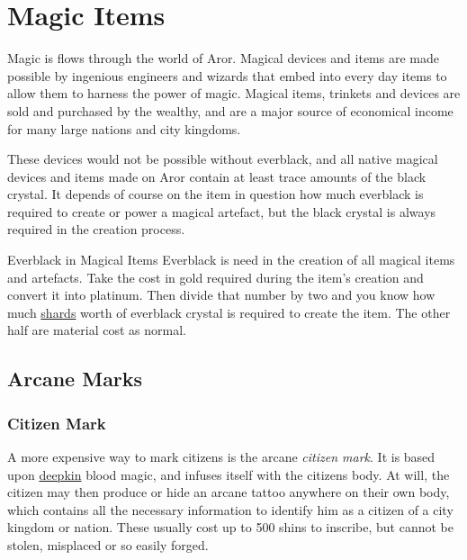 \section{Magic Items}
\label{sec:Magic Items}

Magic is flows through the world of Aror. Magical devices and items
are made possible by ingenious engineers and wizards that embed
 into every day items to allow them to harness
the power of magic. Magical items, trinkets and devices are sold and
purchased by the wealthy, and are a major source of economical income
for many large nations and city kingdoms.

These devices would not be possible without everblack, and all native
magical devices and items made on Aror contain at least trace amounts
of the black crystal. It depends of course on the item in question how
much everblack is required to create or power a magical artefact, but
the black crystal is always required in the creation process.

\begin{35e}{Everblack in Magical Items}
  Everblack is need in the creation of all magical items and artefacts.
  Take the cost in gold required during the item's creation and convert
  it into platinum. Then divide that number by two and you know how much
  \hyperref[sec:Shard]{shards} worth of everblack crystal is required to
  create the item. The other half are material cost as normal.
\end{35e}

\subsection{Arcane Marks}
\label{sec:Arcane Marks}

\subsubsection{Citizen Mark}
\label{sec:Citizen Mark}

A more expensive way to mark citizens is the arcane \emph{citizen mark}. It is
based upon \hyperref[sec:Deepkin]{deepkin} blood magic, and infuses itself
with the citizens body. At will, the citizen may then produce or hide an
arcane tattoo anywhere on their own body, which contains all the necessary
information to identify him as a citizen of a city kingdom or nation. These
usually cost up to 500 shins to inscribe, but cannot be stolen, misplaced or
so easily forged.

